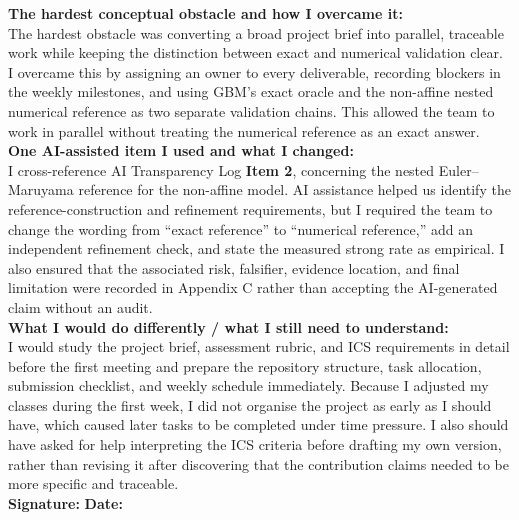 \documentclass[11pt,a4paper]{article}
\theoremstyle{definition}
\theoremstyle{remark}
\begin{document}
\begin{formbox}
\begin{enumerate}[leftmargin=2em]
\end{enumerate}

\textbf{The hardest conceptual obstacle and how I overcame it:}\\
The hardest obstacle was converting a broad project brief into parallel,
traceable work while keeping the distinction between exact and numerical
validation clear. I overcame this by assigning an owner to every deliverable,
recording blockers in the weekly milestones, and using GBM's exact oracle and
the non-affine nested numerical reference as two separate validation chains.
This allowed the team to work in parallel without treating the numerical
reference as an exact answer.\\[0.4em]

\textbf{One AI-assisted item I used and what I changed:}\\
I cross-reference AI Transparency Log \textbf{Item 2}, concerning the nested
Euler--Maruyama reference for the non-affine model. AI assistance helped us
identify the reference-construction and refinement requirements, but I
required the team to change the wording from ``exact reference'' to
``numerical reference,'' add an independent refinement check, and state the
measured strong rate as empirical. I also ensured that the associated risk,
falsifier, evidence location, and final limitation were recorded in
Appendix C rather than accepting the AI-generated claim without an audit.\\[0.4em]

\textbf{What I would do differently / what I still need to understand:}\\
I would study the project brief, assessment rubric, and ICS requirements in
detail before the first meeting and prepare the repository structure, task
allocation, submission checklist, and weekly schedule immediately. Because I
adjusted my classes during the first week, I did not organise the project as
early as I should have, which caused later tasks to be completed under time
pressure. I also should have asked for help interpreting the ICS criteria
before drafting my own version, rather than revising it after discovering that
the contribution claims needed to be more specific and traceable.\\[0.6em]

\textbf{Signature:} \underline{\hspace{4cm}}\qquad
\textbf{Date:} \underline{\hspace{2.5cm}}

\end{formbox}
\end{document}
